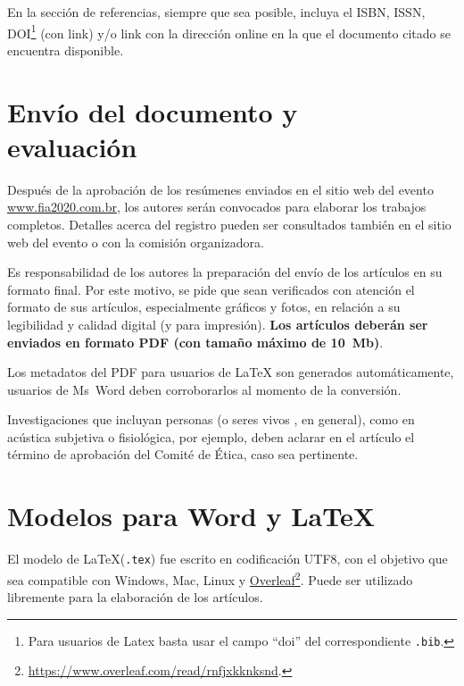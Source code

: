 \documentclass[12pt, a4paper, twoside, twocolumn]{article}
\begin{document}
En la sección de referencias, siempre que sea posible, incluya el ISBN, ISSN, DOI\footnote{Para usuarios de Latex basta usar el campo ``doi'' del correspondiente \texttt{.bib}.} (con link) y/o link con la dirección online en la que el documento citado se encuentra disponible.

\section{Envío del documento y\\ evaluación}

Después de la aprobación de los resúmenes enviados en el sitio web del evento \url{www.fia2020.com.br}, los autores serán convocados para elaborar los trabajos completos. Detalles acerca del registro pueden ser consultados también en el sitio web del evento o con la comisión organizadora.

Es responsabilidad de los autores la preparación del envío de los artículos en su formato final. Por este motivo, se pide que sean verificados con atención el formato de sus artículos, especialmente gráficos y fotos, en relación a su legibilidad y calidad digital (y para impresión). \textbf{Los artículos deberán ser enviados en formato PDF (con tamaño máximo de 10~Mb)}.

Los metadatos del PDF para usuarios de \LaTeX\xspace son generados automáticamente, usuarios de Ms~Word deben corroborarlos al momento de la conversión.

Investigaciones que incluyan personas (o seres vivos , en general), como en acústica subjetiva o fisiológica, por ejemplo, deben aclarar en el artículo el término de aprobación del Comité de Ética, caso sea pertinente.

\section{Modelos para Word y \LaTeX}

El modelo de \LaTeX\xspace (\texttt{.tex}) fue escrito en codificación UTF8, con el objetivo que sea compatible con Windows, Mac, Linux y \href{https://www.overleaf.com/read/rnfjxkknksnd}{Overleaf}\footnote{\url{https://www.overleaf.com/read/rnfjxkknksnd}.}. Puede ser utilizado libremente para la elaboración de los artículos.
\end{document}
